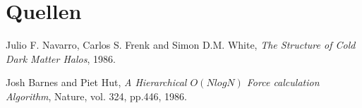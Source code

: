 \section{Quellen}

\begin{thebibliography}{99}

    Julio F. Navarro, Carlos S. Frenk and Simon D.M. White,
    \textit{The Structure of Cold Dark Matter Halos},
    1986.

    Josh Barnes and Piet Hut,
    \textit{A Hierarchical \(O ( N log N )\) Force calculation Algorithm},
    Nature,
    vol. 324, pp.446,
    1986.


\end{thebibliography}

